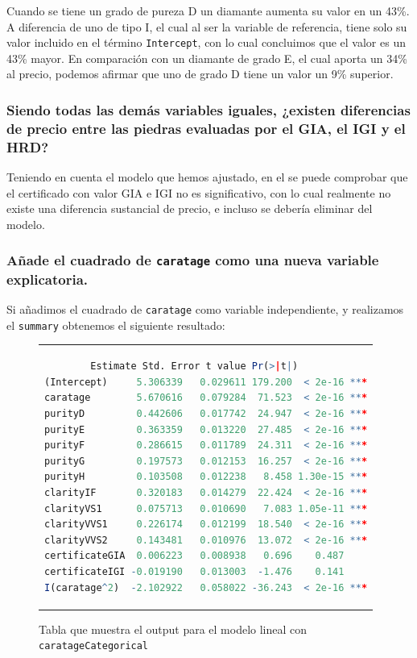 \documentclass[a4paper, 9pt]{article}
\begin{document}
Cuando se tiene un grado de pureza D un diamante aumenta su valor en un 43\%. A diferencia de uno de tipo I, el cual al ser la variable de referencia, tiene solo su valor incluido en el término \texttt{Intercept}, con lo cual concluimos que el valor es un 43\% mayor. En comparación con un diamante de grado E, el cual aporta un 34\% al precio, podemos afirmar que uno de grado D tiene un valor un 9\% superior.

\subsubsection{Siendo todas las demás variables iguales, ¿existen diferencias de precio entre las piedras evaluadas por el GIA, el IGI y el HRD? }

Teniendo en cuenta el modelo que hemos ajustado, en el se puede comprobar que el certificado con valor GIA e IGI no es significativo, con lo cual realmente no existe una diferencia sustancial de precio, e incluso se debería eliminar del modelo. 

\subsubsection{Añade el cuadrado de \texttt{caratage} como una nueva variable explicatoria.}

Si añadimos el cuadrado de \texttt{caratage} como variable independiente, y realizamos el \texttt{summary} obtenemos el siguiente resultado:

\begin{figure}[h!]
    \centering
    \begin{tabular}{c}
        \begin{lstlisting}[language=r]
                Estimate Std. Error t value Pr(>|t|)    
(Intercept)     5.306339   0.029611 179.200  < 2e-16 ***
caratage        5.670616   0.079284  71.523  < 2e-16 ***
purityD         0.442606   0.017742  24.947  < 2e-16 ***
purityE         0.363359   0.013220  27.485  < 2e-16 ***
purityF         0.286615   0.011789  24.311  < 2e-16 ***
purityG         0.197573   0.012153  16.257  < 2e-16 ***
purityH         0.103508   0.012238   8.458 1.30e-15 ***
clarityIF       0.320183   0.014279  22.424  < 2e-16 ***
clarityVS1      0.075713   0.010690   7.083 1.05e-11 ***
clarityVVS1     0.226174   0.012199  18.540  < 2e-16 ***
clarityVVS2     0.143481   0.010976  13.072  < 2e-16 ***
certificateGIA  0.006223   0.008938   0.696    0.487    
certificateIGI -0.019190   0.013003  -1.476    0.141    
I(caratage^2)  -2.102922   0.058022 -36.243  < 2e-16 ***
        \end{lstlisting}
    \end{tabular}
    \caption{Tabla que muestra el output para el modelo lineal con \texttt{caratageCategorical}}
    \label{fig:summary_model}
\end{figure}
\end{document}
